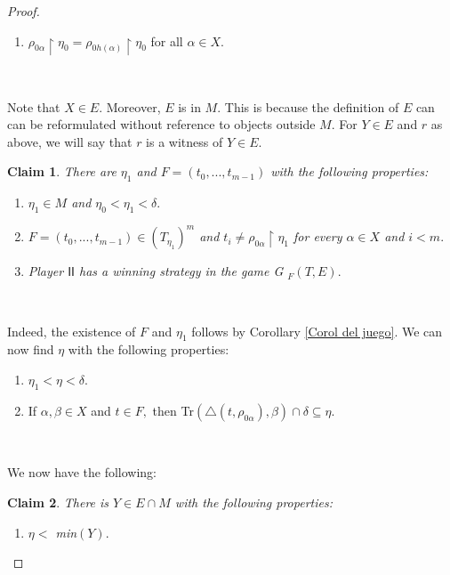 \documentclass[10pt,a4paper]{amsart}
\newtheorem{claim}{Claim}
\begin{document}
\begin{proof}
\begin{enumerate}
\begin{enumerate}
\item $\rho_{0\alpha}\upharpoonright\eta_{0}=\rho_{0h\left(  \alpha\right)
}\upharpoonright\eta_{0}$ for all $\alpha\in X.$
\end{enumerate}
\end{enumerate}

\qquad\ \qquad\ \qquad\ \ \ 

Note that $X\in E.$ Moreover, $E$ is in $M.$ This is because the definition of
$E$ can can be reformulated without reference to objects outside $M.$ For
$Y\in E$ and $r$ as above, we will say that $r$ is a witness of $Y\in E.$

\begin{claim}
There are $\eta_{1}$ and $F=\left(  t_{0},...,t_{m-1}\right)  $ with the
following properties:

\begin{enumerate}
\item $\eta_{1}\in M$ and $\eta_{0}<\eta_{1}<\delta.$

\item $F=\left(  t_{0},...,t_{m-1}\right)  \in\left(  T_{\eta_{1}}\right)
^{m}$ and $t_{i}\neq\rho_{0\alpha}\upharpoonright\eta_{1}$ for every
$\alpha\in X$ and $i<m.$

\item Player $\mathsf{II}$ has a winning strategy in the game \emph{G}%
$_{F}\left(  T,E\right)  .$
\end{enumerate}
\end{claim}

\qquad\ \ \ \qquad\ 

Indeed, the existence of $F$ and $\eta_{1}$ follows by Corollary
\ref{Corol del juego}. We can now find $\eta$ with the following properties:

\begin{enumerate}
\item $\eta_{1}<\eta<\delta.$

\item If $\alpha,\beta\in X$ and $t\in F,$ then \textsf{Tr}$(\triangle
(t,\rho_{0\alpha}),\beta)\cap\delta\subseteq\eta.$
\end{enumerate}

\qquad\ \qquad\ \ 

We now have the following:

\begin{claim}
There is $Y\in E\cap M$ with the following properties:
\label{Claim PFA C suc cosa Y}

\begin{enumerate}
\item $\eta<$ \textsf{min}$\left(  Y\right)  .$


\end{enumerate}
\end{claim}
\end{proof}
\end{document}
